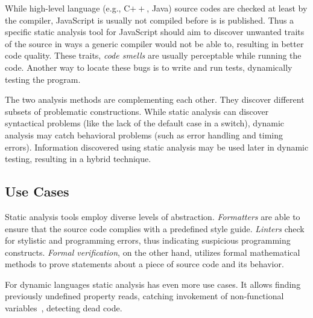 
While high-level language (e.g., C$++$, Java) source codes are checked at least by the compiler, JavaScript is usually not compiled before is is published. Thus a specific static analysis tool for JavaScript should aim to discover unwanted traits of the source in ways a generic compiler would not be able to, resulting in better code quality. These traits, \emph{code smells} are usually perceptable while running the code. Another way to locate these bugs is to write and run tests, dynamically testing the program.

The two analysis methods are complementing each other. They discover different subsets of problematic constructions. While static analysis can discover syntactical problems (like the lack of the default case in a switch), dynamic analysis may catch behavioral problems (such as error handling and timing errors). Information discovered using static analysis may be used later in dynamic testing, resulting in a hybrid technique.



\subsection{Use Cases}
Static analysis tools employ diverse levels of abstraction. \emph{Formatters} are able to ensure that the source code complies with a predefined style guide. \emph{Linters} check for stylistic and programming errors, thus indicating suspicious programming constructs. \emph{Formal verification}, on the other hand, utilizes formal mathematical methods to prove statements about a piece of source code and its behavior.

For dynamic languages static analysis has even more use cases. It allows finding previously undefined property reads, catching invokement of non-functional variables~\cite{jensen_type_2009}, detecting dead code.


